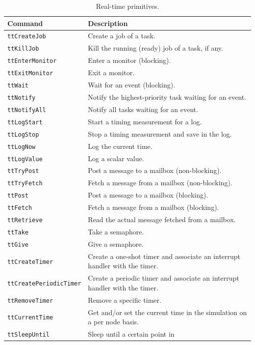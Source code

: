 \documentclass[final,twoside]{rapport}
\begin{document}
\begin{table}[htbp]
\caption{Real-time primitives.}
\label{table:prim}
\small
\begin{center}
\begin{tabularx}{\hsize}{|l|>{\raggedright\arraybackslash}X|}
\hline
Command & Description \\ \hline
{\tt ttCreateJob} & Create a job of a task. \\
{\tt ttKillJob} & Kill the running (ready) job of a task, if any. \\
{\tt ttEnterMonitor} & Enter a monitor (blocking). \\
{\tt ttExitMonitor} & Exit a monitor. \\
{\tt ttWait} & Wait for an event (blocking). \\
{\tt ttNotify} & Notify the highest-priority task waiting for an event. \\
{\tt ttNotifyAll} & Notify all tasks waiting for an event. \\
{\tt ttLogStart} & Start a timing measurement for a log. \\
{\tt ttLogStop} & Stop a timing measurement and save in the log. \\
{\tt ttLogNow} & Log the current time. \\
{\tt ttLogValue} & Log a scalar value. \\
{\tt ttTryPost} & Post a message to a mailbox (non-blocking). \\
{\tt ttTryFetch} & Fetch a message from a mailbox (non-blocking). \\
{\tt ttPost} & Post a message to a mailbox (blocking). \\
{\tt ttFetch} & Fetch a message from a mailbox (blocking). \\
{\tt ttRetrieve} & Read the actual message fetched from a mailbox. \\
{\tt ttTake} & Take a semaphore. \\
{\tt ttGive} & Give a semaphore. \\
{\tt ttCreateTimer} & Create a one-shot timer and associate an
interrupt handler with the timer. \\
{\tt ttCreatePeriodicTimer} & Create a periodic timer and associate an
interrupt handler with the timer. \\
{\tt ttRemoveTimer} & Remove a specific timer. \\
{\tt ttCurrentTime} & Get and/or set the current time in the
simulation on a per node basis. \\
{\tt ttSleepUntil} & Sleep until a certain point in

\end{tabularx}
\end{center}
\end{table}
\end{document}
